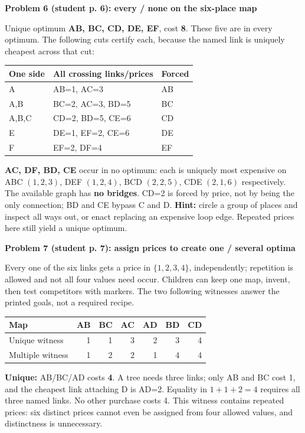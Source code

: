 \documentclass[11pt,letterpaper]{article}
\newcommand\topic[1]{\par\vspace{5pt}{\large\bfseries #1}\par}
\newcommand\task[2]{\par\vspace{3pt}\textbf{Problem #1 (student p. #1): #2}\par}
\begin{document}
\task{6}{every / none on the six-place map}
Unique optimum \textbf{AB, BC, CD, DE, EF}, cost \textbf{8}. These five are in every optimum. The following cuts certify each, because the named link is uniquely cheapest across that cut:
\begin{center}\small
\begin{tabular}{lll}
\toprule One side & All crossing links/prices & Forced\\\midrule
A & AB=1, AC=3 & AB\\
A,B & BC=2, AC=3, BD=5 & BC\\
A,B,C & CD=2, BD=5, CE=6 & CD\\
E & DE=1, EF=2, CE=6 & DE\\
F & EF=2, DF=4 & EF\\\bottomrule
\end{tabular}
\end{center}
\textbf{AC, DF, BD, CE} occur in no optimum: each is uniquely most expensive on ABC $(1,2,3)$, DEF $(1,2,4)$, BCD $(2,2,5)$, CDE $(2,1,6)$ respectively. The available graph has \textbf{no bridges}. CD=2 is forced by price, not by being the only connection; BD and CE bypass C and D. \textbf{Hint:} circle a group of places and inspect all ways out, or enact replacing an expensive loop edge. Repeated prices here still yield a unique optimum.
\newpage

\topic{Inverse design and enumeration: Problem 7}
\begingroup\setlength\parskip{4pt}\renewcommand{}
\task{7}{assign prices to create one / several optima}
Every one of the six links gets a price in $\{1,2,3,4\}$, independently; repetition is allowed and not all four values need occur. Children can keep one map, invent, then test competitors with markers. The two following witnesses answer the printed goals, not a required recipe.

\begin{center}
\begin{tabular}{lrrrrrr}
\toprule Map & AB & BC & AC & AD & BD & CD\\\midrule
Unique witness & 1 & 1 & 3 & 2 & 3 & 4\\
Multiple witness & 1 & 2 & 2 & 1 & 4 & 4\\\bottomrule
\end{tabular}
\end{center}
\textbf{Unique:} AB/BC/AD costs \textbf{4}. A tree needs three links; only AB and BC cost 1, and the cheapest link attaching D is AD=2. Equality in $1+1+2=4$ requires all three named links. No other purchase costs 4. This witness contains repeated prices: six distinct prices cannot even be assigned from four allowed values, and distinctness is unnecessary.
\end{document}
